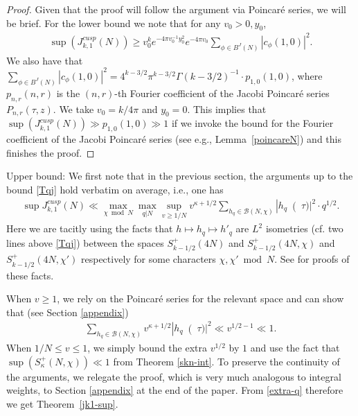 \documentclass[11pt]{amsart}
\makeatletter
\numberwithin{equation}{section}
\renewcommand\subsubsection{\@secnumfont}{\bfseries}%
\renewcommand\subsubsection{\@startsection{subsubsection}{3}
  \z@{.5\linespacing\@plus.7\linespacing}{-.5em}%
  {\normalfont\bfseries}}
\theoremstyle{plain}
\theoremstyle{definition}
\newcommand{\thmref}[1]{Theorem~\ref{#1}}
\newcommand{\lemref}[1]{Lemma~\ref{#1}}
\newcommand{\mc}{\mathcal}
\newcommand{\sumn}{\sum \nolimits}
\newcommand{\jkn}{J^{cusp}_{k,1}(N)}
\makeatother
\begin{document}
\begin{proof}
Given that the proof will follow the argument via Poincar\'e series, we will be brief. For the lower bound we note that for any $v_0>0,y_0$,
\begin{align}
    \sup(\jkn) \ge  v_0^{k} e^{-4\pi   v_0^{-1}y^2_0 } e^{-4\pi v_0}\sum \nolimits_{\phi\in B^J(N)} |c_\phi(1,0)|^2.
\end{align}
We also have that $\sum \nolimits_{\phi\in B^J(N)}|c_\phi(1,0)|^2=  4^{k-3/2} \pi^{k-3/2} \Gamma(k-3/2)^{-1} \cdot p_{1,0}(1,0)$, where $p_{n,r}(n,r)$ is the $(n,r)$-th Fourier coefficient of the Jacobi Poincar\'e series $P_{n,r}(\tau,z)$. We take $v_0=k/4 \pi$ and $y_0=0$. This implies that 
$\sup(\jkn)  \gg  p_{1,0}(1,0) \gg 1$ if we invoke the bound for the Fourier coefficient of the Jacobi Poincar\'e series (see e.g., \lemref{poincareN}) and this finishes the proof.
\end{proof}

\subsubsection{Upper bound:}
We first note that in the previous section, the arguments up to the bound \eqref{Tqj} hold verbatim on average, i.e., one has
\begin{align} \label{extra-q}
    \sup \jkn \ll \max_{\chi \bmod N } \max_{q |N} \sup_{ v \ge 1/N} v^{\kappa+1/2} \sumn_{h_q \in \mc B(N, \chi)} \left| h_{q} \right (\tau)|^2  \cdot q^{1/2}.
\end{align}
Here we are tacitly using the facts that $h \mapsto h_q \mapsto h'_q$ are $L^2$ isometries (cf. two lines above \eqref{Tqj}) between the spaces $S_{k-1/2}^+\left( 4N \right)$ and $S_{k-1/2}^+\left(4N, \chi \right)$ and $S_{k-1/2}^+\left(4N, \chi' \right)$ respectively for some characters $\chi, \chi' \bmod N$. See \cite{kohnen1982newforms} for proofs of these facts.

When $v \ge 1$, we rely on the Poincar\'e series for the relevant space and can show that (see Section \ref{appendix})
\begin{align}
    \sumn_{h_q \in \mc B(N, \chi)}v^{\kappa+1/2}  \left| h_{q} \right (\tau)|^2 \ll v^{1/2-1} \ll 1.
\end{align}
When $1/N \le v \le 1$, we simply bound the extra $v^{1/2}$ by $1$ and use the fact that $\sup( S^+_\kappa(N,\chi)) \ll 1$ from Theorem \ref{skn-int}. To preserve the continuity of the arguments, we relegate the proof, which is very much analogous to integral weights, to Section \ref{appendix} at the end of the paper. From \eqref{extra-q} therefore we get \thmref{jk1-sup}. 
\end{document}
